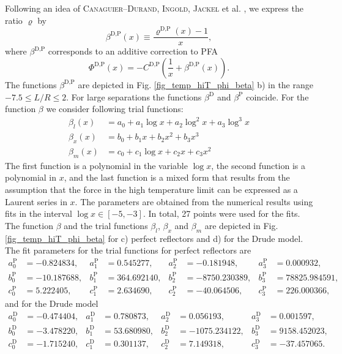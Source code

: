 Following an idea of \textsc{Canaguier--Durand}, \textsc{Ingold}, \textsc{Jackel} et al. \cite{PhysRevA.85.052501},
we express the ratio $\varrho$ by
\begin{equation}
\beta^{\text{D},\text{P}}(x) \equiv \frac{\varrho^{\text{D}, \text{P}}(x)-1}{x},
\end{equation}
where $\beta^{\text{D},\text{P}}$ corresponds to an additive correction to PFA
\begin{equation}
\Phi^{\text{D},\text{P}}(x) = -C^{\text{D},\text{P}} \left(\frac{1}{x} + \beta^{\text{D},\text{P}}(x)\right).
\end{equation}
The functions $\beta^{\text{D},\text{P}}$ are depicted in Fig.
\ref{fig_temp_hiT_phi_beta} b) in the range $-7.5 \le L/R \le 2$. For large
separations the functions $\beta^\text{D}$ and $\beta^\text{P}$ coincide.
For the function $\beta$ we consider following trial functions:
\begin{align}
\beta_l(x) &= a_0 + a_1 \log x + a_2 \log^2 x + a_3 \log^3 x \\
\beta_x(x) &= b_0 + b_1 x + b_2 x^2 + b_3 x^3 \\
\beta_m(x) &= c_0 + c_1 \log x + c_2 x + c_3 x^2
\end{align}
The first function is a polynomial in the variable $\log x$, the second
function is a polynomial in $x$, and the last function is a mixed form that
results from the assumption that the force in the high temperature limit can be expressed as a Laurent series
in $x$. The parameters are obtained from the numerical
results using fits in the interval $\log x \in [-5, -3]$. In total, 27 points
were used for the fits. The function $\beta$ and the trial functions
$\beta_l$, $\beta_x$ and $\beta_m$ are depicted in Fig. \ref{fig_temp_hiT_phi_beta}
for c) perfect reflectors and d) for the Drude model.
The fit parameters for the trial functions for perfect reflectors are
\begin{align}
\nonumber
a_0^\text{P} &= -0.824834,  & a_1^\text{P} &= 0.545277,   & a_2^\text{P} &= -0.181948,    & a_3^\text{P} &= 0.000932, \\
\nonumber
b_0^\text{P} &= -10.187688, & b_1^\text{P} &= 364.692140, & b_2^\text{P} &= -8750.230389, & b_3^\text{P} &= 78825.984591, \\
\nonumber
c_0^\text{P} &=  5.222405,  & c_1^\text{P} &= 2.634690,   & c_2^\text{P} &= -40.064506,   & c_3^\text{P} &= 226.000366,
\end{align}
and for the Drude model
\begin{align}
\nonumber
a_0^\text{D} &= -0.474404,  & a_1^\text{D} &= 0.780873,   & a_2^\text{D} &=  0.056193,    & a_3^\text{D} &= 0.001597, \\
\nonumber
b_0^\text{D} &= -3.478220,  & b_1^\text{D} &= 53.680980,  & b_2^\text{D} &= -1075.234122, & b_3^\text{D} &= 9158.452023, \\
\nonumber
c_0^\text{D} &= -1.715240,  & c_1^\text{D} &= 0.301137,   & c_2^\text{D} &=  7.149318,    & c_3^\text{D} &= -37.457065.
\end{align}
